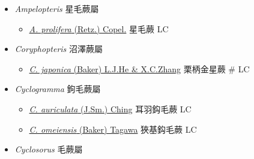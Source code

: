 
  \begin{itemize}
 \item[    ] \textit{Ampelopteris} 星毛蕨屬
                                
  \begin{itemize}
        \item[] \href{http://www.theplantlist.org/tpl1.1/search?q=Ampelopteris+prolifera}{\textit{A. prolifera} (Retz.) Copel.}   星毛蕨   LC
  \end{itemize}
 \item[    ] \textit{Coryphopteris} 沼澤蕨屬
                                
  \begin{itemize}
        \item[] \href{http://www.theplantlist.org/tpl1.1/search?q=Coryphopteris+japonica}{\textit{C. japonica} (Baker) L.J.He \& X.C.Zhang}   栗柄金星蕨  \# LC
  \end{itemize}
 \item[    ] \textit{Cyclogramma} 鉤毛蕨屬
                                
  \begin{itemize}
        \item[] \href{http://www.theplantlist.org/tpl1.1/search?q=Cyclogramma+auriculata}{\textit{C. auriculata} (J.Sm.) Ching}   耳羽鈎毛蕨   LC
        \item[] \href{http://www.theplantlist.org/tpl1.1/search?q=Cyclogramma+omeiensis}{\textit{C. omeiensis} (Baker) Tagawa}   狹基鈎毛蕨   LC
  \end{itemize}
 \item[    ] \textit{Cyclosorus} 毛蕨屬
                                

\end{itemize}
